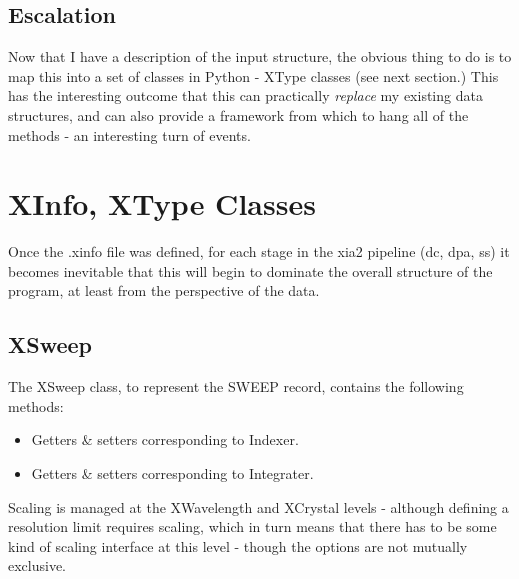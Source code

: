 \documentclass[a4paper, 11pt]{article}
\begin{document}
\subsection{Escalation}

Now that I have a description of the input structure, the obvious thing
to do is to map this into a set of classes in Python - XType classes
(see next section.) This has the interesting outcome that this can practically
\emph{replace} my existing data structures, and can also provide a 
framework from which to hang all of the methods - an interesting turn of
events.

\section{XInfo, XType Classes}

Once the .xinfo file was defined, for each stage in the xia2 pipeline
(dc, dpa, ss) it becomes inevitable that this will begin to dominate the
overall structure of the program, at least from the perspective of the 
data. 

\subsection{XSweep}

The XSweep class, to represent the SWEEP record, contains the following 
methods:

\begin{itemize}
\item{Getters \& setters corresponding to Indexer.}
\item{Getters \& setters corresponding to Integrater.}
\end{itemize}

Scaling is managed at the XWavelength and XCrystal levels - although defining
a resolution limit requires scaling, which in turn means that there has to
be some kind of scaling interface at this level - though the options are
not mutually exclusive.
\end{document}
